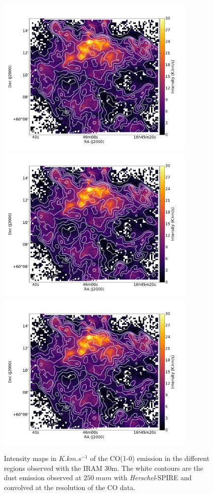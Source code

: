 \documentclass[traditabstract]{aa}
\begin{document}
\begin{figure}[h]
  \hspace{3mm}
  \includegraphics[page=5,height=7.8cm,trim=165 30 230 75,clip=true]{Figures/CO10_intensity.pdf} \\
  \includegraphics[page=3,height=7.8cm,trim=55 30 120 75,clip=true]{Figures/CO10_intensity.pdf}
  \hspace{3mm}
  \includegraphics[page=6,height=7.8cm,trim=215 30 280 75,clip=true]{Figures/CO10_intensity.pdf}
  \caption{\label{Draco_CO10} Intensity maps in $K.km.s^{-1}$ of the CO(1-0) emission in the different regions observed with the IRAM 30m. The white contours are the dust emission observed at $250\: mu m$ with \emph{Herschel}-SPIRE and convolved at the resolution of the CO data.}
\end{figure}
\end{document}
